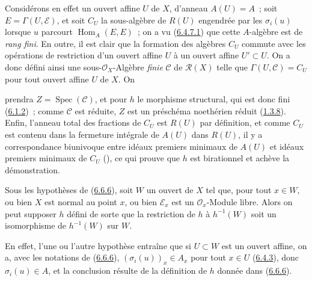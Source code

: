 Considérons en effet un ouvert affine $U$ de $X$, d'anneau $A(U)=A$~; soit
$E=\Gamma(U,\mathcal{E})$, et soit $C_U$ la sous-algèbre de $R(U)$ engendrée
par les $\sigma_i(u)$ lorsque $u$ parcourt $\operatorname{Hom}_A(E,E)$~; on
a vu (\hyperref[II.6.4.7.1-fr]{6.4.7.1}) que cette $A$-algèbre est de
\emph{rang fini}. En outre, il est clair que la formation des algèbres $C_U$
commute avec les opérations de restriction d'un ouvert affine $U$ à un ouvert
affine $U'\subset U$. On a donc défini ainsi une sous-$\mathcal{O}_X$-Algèbre
\emph{finie} $\mathcal{C}$ de $\mathcal{R}(X)$ telle que
$\Gamma(U,\mathcal{C})=C_U$ pour tout ouvert affine $U$ de $X$. On


prendra $Z=\operatorname{Spec}(\mathcal{C})$, et pour $h$ le morphisme
structural, qui est donc fini (\hyperref[II.6.1.2-fr]{6.1.2})~; comme
$\mathcal{C}$ est réduite, $Z$ est un préschéma noethérien réduit
(\hyperref[II.1.3.8-fr]{1.3.8}). Enfin, l'anneau total des fractions de $C_U$
est $R(U)$ par définition, et comme $C_U$ est contenu dans la fermeture
intégrale de $A(U)$ dans $R(U)$, il y a correspondance biunivoque entre idéaux
premiers minimaux de $A(U)$ et idéaux premiers minimaux de $C_U$
(\cite[t.~I, p.~259]{I-13}), ce qui prouve que $h$ est birationnel et achève
la démonstration.

\begin{corollary}[6.6.7]
\label{II.6.6.7-fr}
Sous les hypothèses de (\hyperref[II.6.6.6-fr]{6.6.6}), soit $W$ un ouvert
de $X$ tel que, pour tout $x\in W$, ou bien $X$ est normal au point $x$, ou
bien $\mathcal{E}_x$ est un $\mathcal{O}_x$-Module libre. Alors on peut
supposer $h$ défini de sorte que la restriction de $h$ à $h^{-1}(W)$ soit un
isomorphisme de $h^{-1}(W)$ sur $W$.
\end{corollary}

En effet, l'une ou l'autre hypothèse entraîne que si $U\subset W$ est un
ouvert affine, on a, avec les notations de
(\hyperref[II.6.6.6-fr]{6.6.6}), $(\sigma_i(u))_x\in A_x$ pour tout
$x\in U$ (\hyperref[II.6.4.3-fr]{6.4.3}), donc $\sigma_i(u)\in A$, et la
conclusion résulte de la définition de $h$ donnée dans
(\hyperref[II.6.6.6-fr]{6.6.6}).

